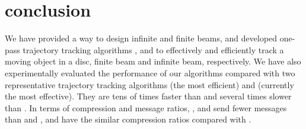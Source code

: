 
\section{conclusion}
\label{sec-conclusion}

We have provided a way to design infinite and finite beams, and developed one-pass trajectory tracking algorithms \citt, \bitt and \sitt to effectively and efficiently track a moving object in a disc, finite beam and infinite beam, respectively.
We have also experimentally evaluated the performance of our algorithms compared with two representative trajectory tracking algorithms \ldrh (the most efficient) and \grts (currently the most effective). 
They are tens of times faster than \grts and several times slower than \ldrh.
In terms of compression and message ratios, \bitt, \citt and \sitt send fewer messages than \grts and \ldrh, and have the similar compression ratios compared with \grts.

